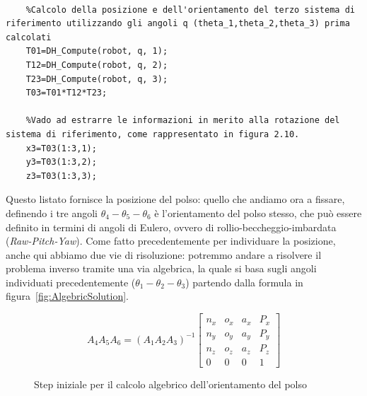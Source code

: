 \begin{lstlisting}[style=Matlab-editor,caption=Matrice  di trasformazione omogenea dei primi tre giunti,captionpos=b,label={Code:MatTrasf}, basicstyle=\footnotesize\ttfamily,frame=trBL]

	%Calcolo della posizione e dell'orientamento del terzo sistema di riferimento utilizzando gli angoli q (theta_1,theta_2,theta_3) prima calcolati
	T01=DH_Compute(robot, q, 1);
	T12=DH_Compute(robot, q, 2);
	T23=DH_Compute(robot, q, 3);
	T03=T01*T12*T23;
	
	%Vado ad estrarre le informazioni in merito alla rotazione del sistema di riferimento, come rappresentato in figura 2.10.
    x3=T03(1:3,1);
	y3=T03(1:3,2);
	z3=T03(1:3,3);
\end{lstlisting}
Questo listato fornisce la posizione del polso: quello che andiamo ora a fissare, definendo i tre angoli $\theta_4 - \theta_5 - \theta_6$ è l'orientamento del polso stesso, che può essere definito in termini di angoli di Eulero, ovvero di rollio-beccheggio-imbardata (\emph{Raw-Pitch-Yaw}). Come fatto precedentemente per individuare la posizione, anche qui abbiamo due vie di risoluzione: potremmo andare a risolvere il problema inverso tramite una via algebrica, la quale si basa sugli angoli individuati precedentemente ($\theta_1 - \theta_2 - \theta_3$) partendo dalla formula in figura~\vref{fig:AlgebricSolution}.
\begin{figure}
	\centering
	\caption{Step iniziale per il calcolo algebrico dell'orientamento del polso}
	\label{fig:AlgebricSolution}
	\begin{equation*}
		A_4A_5A_6 = (A_1A_2A_3)^{-1}		
		\begin{bmatrix}
		n_x & o_x & a_x & P_x\\
		n_y & o_y & a_y & P_y\\
		n_z & o_z & a_z & P_z\\
		0   & 0   & 0   & 1
		\end{bmatrix} 
	\end{equation*}
\end{figure}

